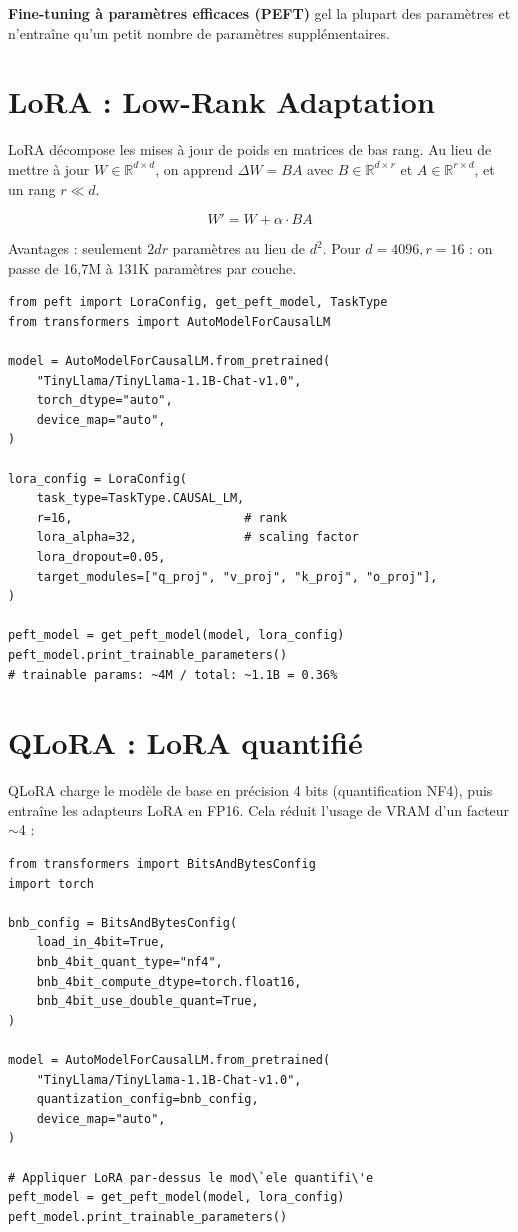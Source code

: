 \textbf{Fine-tuning \`a param\`etres efficaces (PEFT)} gel la plupart des param\`etres et n'entra\^ine qu'un petit nombre de param\`etres suppl\'ementaires.

\section{LoRA : Low-Rank Adaptation}

LoRA d\'ecompose les mises \`a jour de poids en matrices de bas rang. Au lieu de mettre \`a jour $W \in \mathbb{R}^{d \times d}$, on apprend $\Delta W = BA$ avec $B \in \mathbb{R}^{d \times r}$ et $A \in \mathbb{R}^{r \times d}$, et un rang $r \ll d$.

\[
W' = W + \alpha \cdot BA
\]

Avantages : seulement $2dr$ param\`etres au lieu de $d^2$. Pour $d=4096, r=16$ : on passe de 16,7M \`a 131K param\`etres par couche.

\begin{verbatim}
from peft import LoraConfig, get_peft_model, TaskType
from transformers import AutoModelForCausalLM

model = AutoModelForCausalLM.from_pretrained(
    "TinyLlama/TinyLlama-1.1B-Chat-v1.0",
    torch_dtype="auto",
    device_map="auto",
)

lora_config = LoraConfig(
    task_type=TaskType.CAUSAL_LM,
    r=16,                        # rank
    lora_alpha=32,               # scaling factor
    lora_dropout=0.05,
    target_modules=["q_proj", "v_proj", "k_proj", "o_proj"],
)

peft_model = get_peft_model(model, lora_config)
peft_model.print_trainable_parameters()
# trainable params: ~4M / total: ~1.1B = 0.36%
\end{verbatim}

\section{QLoRA : LoRA quantifi\'e}

QLoRA charge le mod\`ele de base en pr\'ecision 4 bits (quantification NF4), puis entra\^ine les adapteurs LoRA en FP16. Cela r\'eduit l'usage de VRAM d'un facteur $\sim$4 :

\begin{verbatim}
from transformers import BitsAndBytesConfig
import torch

bnb_config = BitsAndBytesConfig(
    load_in_4bit=True,
    bnb_4bit_quant_type="nf4",
    bnb_4bit_compute_dtype=torch.float16,
    bnb_4bit_use_double_quant=True,
)

model = AutoModelForCausalLM.from_pretrained(
    "TinyLlama/TinyLlama-1.1B-Chat-v1.0",
    quantization_config=bnb_config,
    device_map="auto",
)

# Appliquer LoRA par-dessus le mod\`ele quantifi\'e
peft_model = get_peft_model(model, lora_config)
peft_model.print_trainable_parameters()
\end{verbatim}

